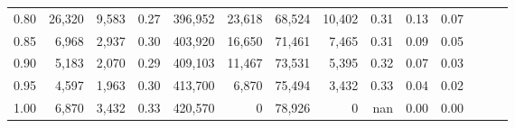 \begin{tabular}{rrrrrrrrrrrrrr}
0.80 &  26,320 &  9,583 &  0.27 &  396,952 &   23,618 &  68,524 &  10,402 &  0.31 &  0.13 &      0.07 \\
0.85 &   6,968 &  2,937 &  0.30 &  403,920 &   16,650 &  71,461 &   7,465 &  0.31 &  0.09 &      0.05 \\
0.90 &   5,183 &  2,070 &  0.29 &  409,103 &   11,467 &  73,531 &   5,395 &  0.32 &  0.07 &      0.03 \\
0.95 &   4,597 &  1,963 &  0.30 &  413,700 &    6,870 &  75,494 &   3,432 &  0.33 &  0.04 &      0.02 \\
1.00 &   6,870 &  3,432 &  0.33 &  420,570 &        0 &  78,926 &       0 &   nan &  0.00 &      0.00 \\
\bottomrule
\end{tabular}
